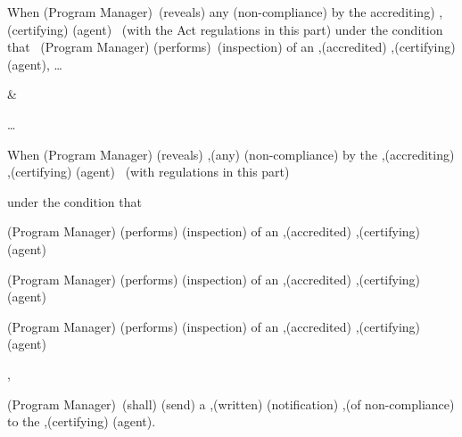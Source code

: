 \begin{landscape}
\begin{longtable}{\tabledims}
\sp

\begin{exi}\Cac{}\lb When \A{}(\lsi Program Manager\rsi)~\I{}(reveals) any \Bdir{}(non-compliance) \lsi by the accrediting)  \Bind{},(certifying) \Bind{}(agent)\rsi~ \Cex{}(with the \lp Act \lsi \OR{} \rsi regulations in this part\rp ) \Cac{}\lb \lsi under the condition that \rsi~\A{}(Program Manager) \I{}(\lsi performs\rsi)~\Bdir{}(inspection) of an \Bind{},(accredited) \Bind{},(certifying) \Bind{}(agent)\rb \rb, \dots \end{exi}

&

\begin{exi}
\dots

\sp

\lb \Cac{}\lb When \A{}(\lsi Program Manager\rsi) \I{}(reveals) \Bdir{},\prop{}(any) \Bdir{}(non-compliance) \lsi by the \Bind{},(accrediting) \Bind{},(certifying)  \Bind{}(agent)\rsi~\Cex{}  (with regulations in this part)

\sp

\Cac{}\lb \lsi under the condition that\rsi

\sp

\lb \A{}(Program Manager) \I{}(\lsi performs\rsi) \Bdir{}(inspection) of an \Bind{},(accredited) \Bind{},(certifying) \Bind{}(agent)\rb 

\sp

\OR

\sp

\lb \A{}(Program Manager) \I{}(\lsi performs\rsi) \Bdir{}(inspection) of an \Bind{},(accredited) \Bind{},(certifying) \Bind{}(agent)\rb 

\sp

\OR

\sp

\lb \A{}(Program Manager) \I{}(\lsi performs\rsi) \Bdir{}(inspection) of an \Bind{},(accredited) \Bind{},(certifying) \Bind{}(agent)\rb 

\rb \rb, 

\A{}(\lsi Program Manager\rsi)~\D{}(shall) \I{}(\lsi send\rsi) a \Bdir{},(written) \Bdir{}(notification) \Bdir{},(of non-compliance) to the \Bind{},(certifying) \Bind{}(agent).\rb 

\end{exi}

\\


\end{longtable}
\end{landscape}
